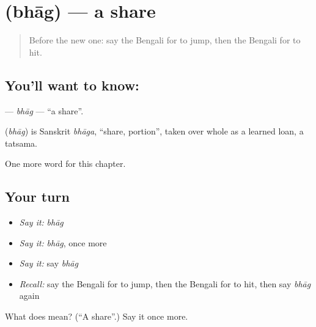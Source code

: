 \section[\texorpdfstring{\bn{ভাগ} (bhāg)}{ভাগ (bhāg)}]{ (bhāg) — a share}

\label{lesson:BN-C103-bhag}



\begin{quote}
Before the new one: say the Bengali for to jump, then the Bengali for to hit.
\end{quote}

\subsection*{You'll want to know: }
\textbf{} — \emph{bhāg} — \textquotedblleft{}a share\textquotedblright{}.

\begin{cousinweb}
\textbf{} (\emph{bhāg}) is Sanskrit \emph{bhāga}, \textquotedblleft{}share, portion\textquotedblright{}, taken over whole as a learned loan, a tatsama.
\end{cousinweb}

\begin{grammarlens}[title={What you've built}]
One more word for this chapter.
\end{grammarlens}

\subsection*{Your turn}
\begin{itemize}
\raggedright
  \item \emph{Say it:} \emph{bhāg}
  \item \emph{Say it:} \emph{bhāg}, once more
  \item \emph{Say it:} say \emph{bhāg}
  \item \emph{Recall:} say the Bengali for to jump, then the Bengali for to hit, then say \emph{bhāg} again
\end{itemize}

\begin{tcolorbox}[breakable,colback=teal!4,colframe=teal!35!black,title={Before you move on}]
What does  mean? (\textquotedblleft{}A share\textquotedblright{}.) Say it once more.
\end{tcolorbox}
